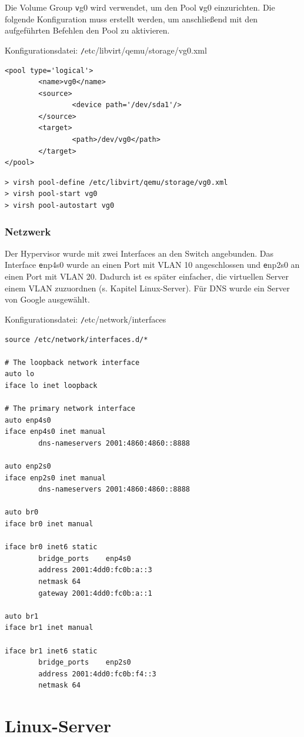 Die Volume Group {\texttt vg0} wird verwendet, um den Pool {\texttt vg0} einzurichten. Die folgende Konfiguration muss erstellt werden, um anschließend mit den aufgeführten Befehlen den Pool zu aktivieren.       

Konfigurationsdatei: {\texttt /etc/libvirt/qemu/storage/vg0.xml}
\begin{lstlisting}
<pool type='logical'>
        <name>vg0</name>
        <source>
                <device path='/dev/sda1'/>
        </source>
        <target>
                <path>/dev/vg0</path>
        </target>
</pool>
\end{lstlisting}
\begin{lstlisting}[numbers=none]
> virsh pool-define /etc/libvirt/qemu/storage/vg0.xml
> virsh pool-start vg0
> virsh pool-autostart vg0
\end{lstlisting}

\subsubsection{Netzwerk}

Der Hypervisor wurde mit zwei Interfaces an den Switch angebunden. Das Interface {\texttt enp4s0} wurde an einen Port mit VLAN 10 angeschlossen und {\texttt enp2s0} an einen Port mit VLAN 20. Dadurch ist es später einfacher, die virtuellen Server einem VLAN zuzuordnen (s. Kapitel \ql Linux-Server\qr). Für DNS wurde ein Server von Google ausgewählt.

Konfigurationsdatei: {\texttt /etc/network/interfaces}
\begin{lstlisting}
source /etc/network/interfaces.d/*

# The loopback network interface
auto lo
iface lo inet loopback

# The primary network interface
auto enp4s0
iface enp4s0 inet manual
        dns-nameservers 2001:4860:4860::8888

auto enp2s0
iface enp2s0 inet manual
        dns-nameservers 2001:4860:4860::8888

auto br0
iface br0 inet manual

iface br0 inet6 static
        bridge_ports    enp4s0
        address 2001:4dd0:fc0b:a::3
        netmask 64
        gateway 2001:4dd0:fc0b:a::1

auto br1
iface br1 inet manual

iface br1 inet6 static
        bridge_ports    enp2s0
        address 2001:4dd0:fc0b:f4::3
        netmask 64
\end{lstlisting}\section{Linux-Server}

